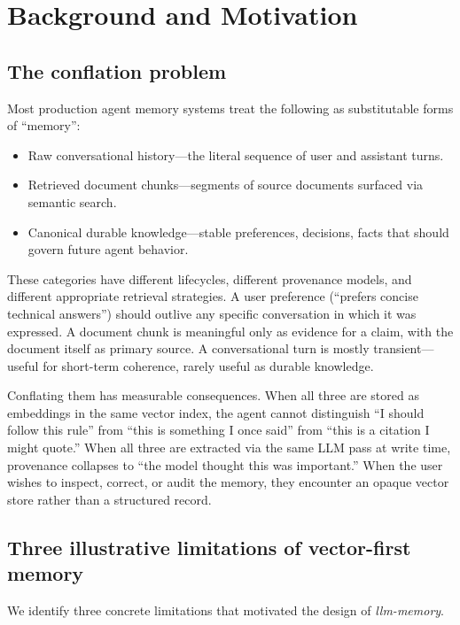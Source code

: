 \documentclass[11pt,a4paper]{article}
\begin{document}
\section{Background and Motivation}

\subsection{The conflation problem}

Most production agent memory systems treat the following as substitutable forms of ``memory'':

\begin{itemize}
 \item Raw conversational history---the literal sequence of user and assistant turns.
 \item Retrieved document chunks---segments of source documents surfaced via semantic search.
 \item Canonical durable knowledge---stable preferences, decisions, facts that should govern future agent behavior.
\end{itemize}

These categories have different lifecycles, different provenance models, and different appropriate retrieval strategies. A user preference (``prefers concise technical answers'') should outlive any specific conversation in which it was expressed. A document chunk is meaningful only as evidence for a claim, with the document itself as primary source. A conversational turn is mostly transient---useful for short-term coherence, rarely useful as durable knowledge.

Conflating them has measurable consequences. When all three are stored as embeddings in the same vector index, the agent cannot distinguish ``I should follow this rule'' from ``this is something I once said'' from ``this is a citation I might quote.'' When all three are extracted via the same LLM pass at write time, provenance collapses to ``the model thought this was important.'' When the user wishes to inspect, correct, or audit the memory, they encounter an opaque vector store rather than a structured record.

\subsection{Three illustrative limitations of vector-first memory}

We identify three concrete limitations that motivated the design of \textit{llm-memory}.
\end{document}
